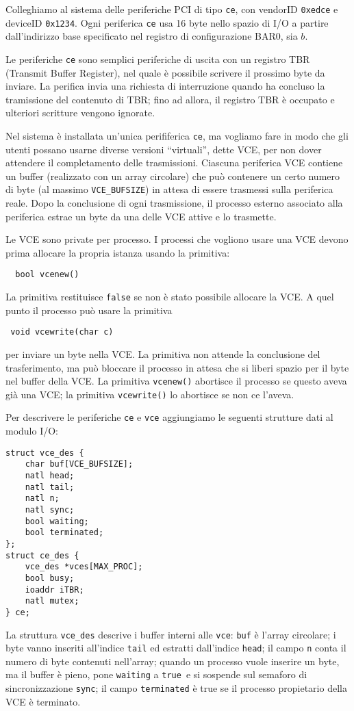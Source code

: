 Colleghiamo al sistema delle periferiche PCI di tipo \verb|ce|, con vendorID \verb|0xedce| e deviceID \verb|0x1234|.
Ogni periferica \verb|ce| usa 16 byte nello spazio di I/O a partire dall'indirizzo base specificato nel
registro di configurazione BAR0, sia $b$.

Le periferiche \verb|ce| sono semplici periferiche di uscita con un registro TBR (Transmit Buffer Register),
nel quale \`e possibile scrivere il prossimo byte da inviare.
La perifica invia una richiesta di
interruzione quando ha concluso la tramissione del contenuto di TBR\@; fino ad allora, il registro
TBR \`e occupato e ulteriori scritture vengono ignorate.

Nel sistema \`e installata un'unica perififerica \verb|ce|, ma vogliamo fare in modo che
gli utenti possano usarne diverse versioni ``virtuali'', dette VCE, per non dover attendere il completamento
delle trasmissioni.
Ciascuna periferica VCE contiene un buffer (realizzato con un array circolare)
che pu\`o contenere un certo numero di byte
(al massimo \verb|VCE_BUFSIZE|) in attesa di essere trasmessi sulla periferica reale.
Dopo la conclusione di ogni trasmissione, il processo esterno associato alla periferica estrae
un byte da una delle VCE attive e lo trasmette.

Le VCE sono private per processo. I processi che vogliono usare una VCE devono prima allocare la
propria istanza usando la primitiva:
\begin{verbatim}
  bool vcenew()
\end{verbatim}
La primitiva restituisce \verb|false| se non \`e stato possibile allocare la VCE\@.
A quel punto il processo pu\`o usare la primitiva
\begin{verbatim}
 void vcewrite(char c)
\end{verbatim}
per inviare un byte nella VCE\@. La primitiva non attende la conclusione del trasferimento, ma pu\`o
bloccare il processo in attesa che si liberi spazio per il byte nel buffer della VCE\@.
La primitiva \verb|vcenew()| abortisce il processo se questo aveva gi\`a una VCE; la primitiva \verb|vcewrite()|
lo abortisce se non ce l'aveva.

Per descrivere le periferiche \verb|ce| e \verb|vce| aggiungiamo le seguenti strutture dati al modulo I/O:
\begin{verbatim}
struct vce_des {
    char buf[VCE_BUFSIZE];
    natl head;
    natl tail;
    natl n;
    natl sync;
    bool waiting;
    bool terminated;
};
struct ce_des {
    vce_des *vces[MAX_PROC];
    bool busy;
    ioaddr iTBR;
    natl mutex;
} ce;
\end{verbatim}
La struttura \verb|vce_des| descrive i buffer interni
alle \verb|vce|: \verb|buf| \`e l'array circolare;
i byte vanno inseriti all'indice \verb|tail| ed estratti
dall'indice \verb|head|; il campo \verb|n| conta il numero
di byte contenuti nell'array; quando un processo vuole inserire
un byte, ma il buffer \`e pieno, pone \verb|waiting| a \verb|true|\
e si sospende sul semaforo di sincronizzazione \verb|sync|;
il campo \verb|terminated| \`e true se il processo propietario della VCE
\`e terminato.

